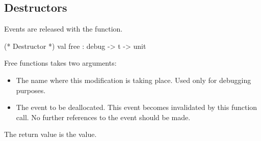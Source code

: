 \subsection{Destructors}
Events are released with the  function.
\begin{codebox}
  (* Destructor *)
val free	: debug -> t -> unit
\end{codebox}

Free functions takes two arguments:
\begin{itemize}
\item
The name where this modification is taking place.  Used only for debugging
purposes.
\item
The event to be deallocated.  This event becomes invalidated by this
function call.  No further references to the event should be made.
\end{itemize}
The return value is the  value.
